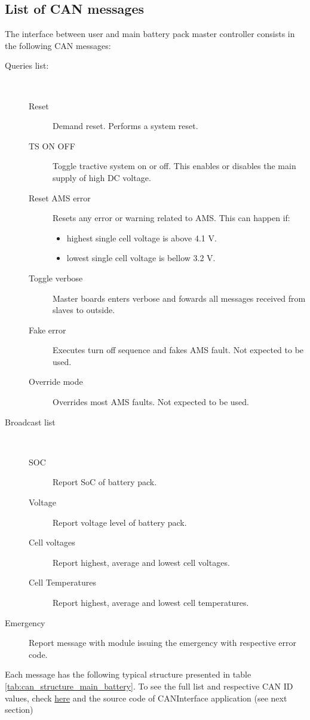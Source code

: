 \subsection{List of CAN messages}
The interface between user and main battery pack master controller consists in the following CAN messages:
\begin{description}
	\item[Queries list:] \
	\begin{description}
		\item[Reset] Demand reset. Performs a system reset.
		\item[TS ON OFF] Toggle tractive system on or off. This enables or disables the main supply of high \gls{DC} voltage.
		\item[Reset AMS error] Resets any error or warning related to \gls{AMS}. This can happen if:
		\begin{itemize}
			\item highest single cell voltage is above 4.1 V.
			\item lowest single cell voltage is bellow 3.2 V.
		\end{itemize}
		\item[Toggle verbose] Master boards enters verbose and fowards all messages received from slaves to outside.
		\item[Fake error] Executes turn off sequence and fakes \gls{AMS} fault. Not expected to be used.
		\item[Override mode] Overrides most \gls{AMS} faults. Not expected to be used. 
	\end{description}
	\item[Broadcast list] \
	\begin{description}
		\item[SOC] Report \gls{SoC} of battery pack.
		\item[Voltage] Report voltage level of battery pack.
		\item[Cell voltages] Report highest, average and lowest cell voltages.
		\item[Cell Temperatures] Report highest, average and lowest cell temperatures.
	\end{description}
	\item[Emergency] Report message with module issuing the emergency with respective error code.
\end{description}

Each message has the following typical structure presented in table \ref{tab:can_structure_main_battery}. To see the full list and respective CAN ID  values, check \href{https://docs.google.com/spreadsheets/d/125uncR7r-g646vKBvJf47TaTHI3FF9lcHkIi9cz6BJQ/edit?usp=sharing}{here} and the source code of CANInterface application (see next section)

